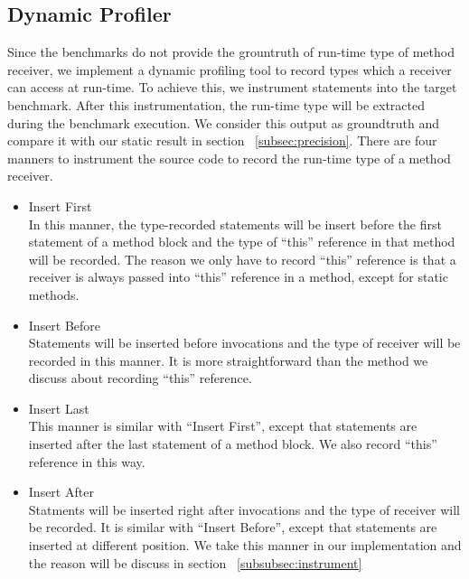 \documentclass{fac}
\begin{document}
\subsection{Dynamic Profiler}\label{subsec:dynamic-profiler}
Since the benchmarks do not provide the grountruth of run-time type of method receiver, we implement a dynamic profiling tool to record  types which a receiver can access at run-time. To achieve this, we instrument statements into the target benchmark. After this instrumentation, the run-time type will be extracted during the benchmark execution. We consider this output as groundtruth and compare it with our static result in section ~\ref{subsec:precision}. There are four manners to instrument the source code to record the run-time type of a method receiver.
\begin{itemize}
\item Insert First\\
In this manner, the type-recorded statements will be insert before the first statement of a method block and the type of ``this'' reference in that method will be recorded. The reason we only have to record ``this'' reference is that a receiver is always passed into ``this'' reference in a method, except for static methods. 
\item Insert Before\\
Statements will be inserted before invocations and the type of receiver will be recorded in this manner. It is more straightforward than the method we discuss about recording ``this'' reference.
\item Insert Last\\
This manner is similar with ``Insert First'', except that statements are inserted after the last statement of a method block. We also record ``this'' reference in this way.
\item Insert After\\
Statments will be inserted right after invocations and the type of receiver will be recorded. It is similar with ``Insert Before'', except that statements are inserted at different position. We take this manner in our implementation and the reason will be discuss in section ~\ref{subsubsec:instrument}
\end{itemize}
\end{document}
